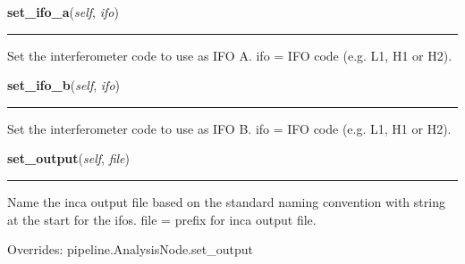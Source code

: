     \label{inspiral:IncaNode:set_ifo_a}
    \vspace{0.5ex}

    \noindent\begin{boxedminipage}{\textwidth}

    \raggedright \textbf{set\_ifo\_a}(\textit{self}, \textit{ifo})

    \vspace{-1.5ex}

    \rule{\textwidth}{0.5\fboxrule}
    Set the interferometer code to use as IFO A. ifo = IFO code (e.g. L1, 
    H1 or H2).

    \vspace{1ex}

    \end{boxedminipage}

    \label{inspiral:IncaNode:set_ifo_b}
    \vspace{0.5ex}

    \noindent\begin{boxedminipage}{\textwidth}

    \raggedright \textbf{set\_ifo\_b}(\textit{self}, \textit{ifo})

    \vspace{-1.5ex}

    \rule{\textwidth}{0.5\fboxrule}
    Set the interferometer code to use as IFO B. ifo = IFO code (e.g. L1, 
    H1 or H2).

    \vspace{1ex}

    \end{boxedminipage}

    \label{inspiral:IncaNode:set_output}
    \vspace{0.5ex}

    \noindent\begin{boxedminipage}{\textwidth}

    \raggedright \textbf{set\_output}(\textit{self}, \textit{file})

    \vspace{-1.5ex}

    \rule{\textwidth}{0.5\fboxrule}
    Name the inca output file based on the standard naming convention 
    with string at the start for the ifos. file = prefix for inca output 
    file.

    \vspace{1ex}

      Overrides: pipeline.AnalysisNode.set\_output

    \end{boxedminipage}


